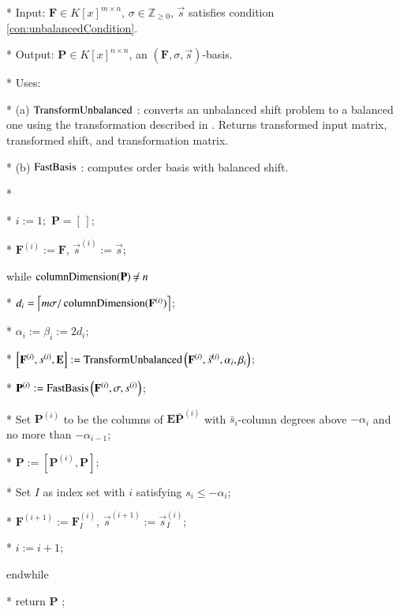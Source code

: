 %
\begin{algorithm}
\caption{$\umab\left(\mathbf{F},\sigma,\vec{s}\right)$ }


\label{alg:umab} 
\begin{algor}
\item [{{{*}}}] Input: $\mathbf{F}\in K\left[x\right]^{m\times n}$,
$\sigma\in\mathbb{Z}_{\ge0}$, $\vec{s}$ satisfies condition \eqref{con:unbalancedCondition}.
\item [{{{*}}}] Output: $\mathbf{P}\in K\left[x\right]^{n\times n}$,
an $\left(\mathbf{F},\sigma,\vec{s}\right)$-basis.
\item [{{{*}}}] Uses:
\item [{{*}}] (a) $\TransformUnbalanced$ : converts an unbalanced shift
problem to a balanced one using the transformation described in .
Returns transformed input matrix, transformed shift, and transformation
matrix.
\item [{{*}}] (b) %
$\mmab$ : computes order basis with balanced shift. 
\item [{{*}}]~\end{algor}
\begin{algor}[1]
\item [{{{*}}}]  $i:=1;$ $\mathbf{P}=[\,]$;
\item [{{{*}}}] $\mathbf{F}^{\left(i\right)}:=\mathbf{F}$, $\vec{s}^{\left(i\right)}:=\vec{s}$;
\item [{{while}}] $\columnDimension(\mathbf{P})\ne n$
\item [{{{*}}}] $d_{i}=\left\lceil m\sigma/\columnDimension(\mathbf{F}^{\left(i\right)})\right\rceil $;
\item [{{{*}}}] $\alpha_{i}:=\beta_{i}:=2d_{i};$
\item [{{{*}}}] $\left[\bar{\mathbf{F}}^{\left(i\right)},\bar{s}^{\left(i\right)},\mathbf{E}\right]:=\TransformUnbalanced\left(\mathbf{F}^{\left(i\right)},\vec{s}^{\left(i\right)},\alpha_{i},\beta_{i}\right)$;
\item [{{{*}}}] $\bar{\mathbf{P}}^{\left(i\right)}:=\mmab\left(\bar{\mathbf{F}}^{\left(i\right)},\sigma,\bar{s}^{\left(i\right)}\right)$;
\item [{{{*}}}] Set $\mathbf{P}^{\left(i\right)}$ to be the columns
of $\mathbf{E}\bar{\mathbf{P}}^{\left(i\right)}$ with $\bar{s}_{i}$-column
degrees above $-\alpha_{i}$ and no more than $-\alpha_{i-1}$;
\item [{{{*}}}] $\mathbf{P}:=\left[\mathbf{P}^{\left(i\right)},\mathbf{P}\right]$;
\item [{{{*}}}] Set $I$ as index set with $i$ satisfying $s_{i}\le-\alpha_{i}$;
\item [{{{*}}}] $\mathbf{F}^{\left(i+1\right)}:=\mathbf{F}_{I}^{\left(i\right)}$,
$\vec{s}^{\left(i+1\right)}:=\vec{s}_{I}^{\left(i\right)}$;
\item [{{{*}}}] $i:=i+1$;
\item [{{endwhile}}] ~
\item [{{{*}}}] return $\mathbf{P}$ ; 
\end{algor}

\end{algorithm}

